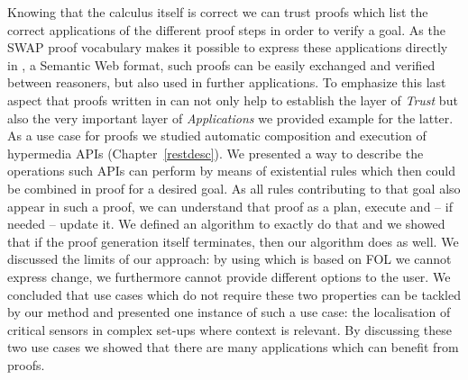 Knowing that the calculus itself is correct we can trust proofs which list the correct applications of the different proof steps in order to verify a goal. 
As the SWAP proof vocabulary makes it possible to express these applications directly in \nthree, a Semantic Web format, such proofs can be easily exchanged and verified between reasoners, but 
also used in further applications. To emphasize this last aspect that proofs written in \nthree can not only help to establish the layer of \emph{Trust} but also the very important layer of 
\emph{Applications} we provided example for the latter.
% 
% 
% 
As a use case for \nthree proofs we studied automatic composition and execution of hypermedia APIs (Chapter~\ref{restdesc}). We presented a way 
to describe the operations such APIs can perform by means of existential rules which then could be combined in proof for a desired goal. 
As all rules contributing to that goal also appear in such a proof, we can understand that proof as a plan, execute and -- if needed -- update it.
We defined an algorithm to exactly do that and we showed that if the proof generation itself terminates, then our algorithm does as well.
We discussed the limits of our approach: by using \nthree which is based on FOL we cannot express change, we furthermore cannot provide different options to the user.
We concluded that use cases which do not require these two properties can be tackled by our method and presented one instance of such a use case: the localisation of critical 
sensors in complex set-ups where context is relevant. By discussing these two use cases we showed that there are many applications which can benefit from \nthree proofs.

% 

